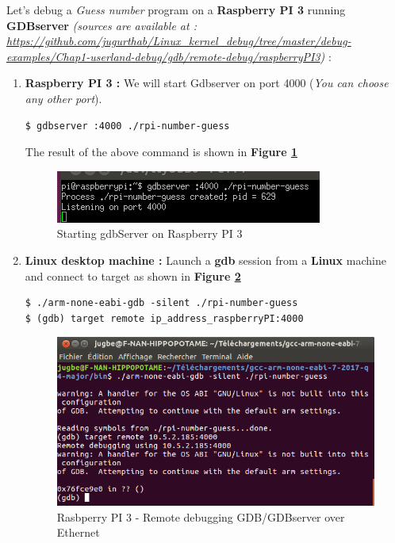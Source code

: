 	


Let's debug a \og \emph{Guess number} \fg program on a \textbf{Raspberry PI 3} running \textbf{GDBserver} \emph{(sources are available at : {\color{blue} \url{https://github.com/jugurthab/Linux_kernel_debug/tree/master/debug-examples/Chap1-userland-debug/gdb/remote-debug/raspberryPI3}})} : 
\begin{enumerate}
	\item \textbf{Raspberry PI 3 : } We will start Gdbserver on port 4000 (\emph{You can choose any other port}).
	\begin{lstlisting}[style=BashInputStyle]
$ gdbserver :4000 ./rpi-number-guess
    \end{lstlisting}

The result of the above command is shown in \textbf{Figure \ref{Starting gdbServer on Raspberry PI 3}}
\begin{figure}[H]
		\centering
        \includegraphics[scale=0.40]{img/solution/starting-ethernet-gdbserver-session-rp3.png}
        \caption{Starting gdbServer on Raspberry PI 3}
        \label{Starting gdbServer on Raspberry PI 3}
    \end{figure}



	\item \textbf{Linux desktop machine :} Launch a \textbf{gdb} session from a \textbf{Linux} machine and connect to target as shown in \textbf{Figure \ref{Rasbperry PI 3 - Remote debugging GDB/GDBserver over Ethernet}}
		\begin{lstlisting}[style=BashInputStyle]
$ ./arm-none-eabi-gdb -silent ./rpi-number-guess
$ (gdb) target remote ip_address_raspberryPI:4000	
    \end{lstlisting}
	
\begin{figure}[H]
		\centering
        \includegraphics[scale=0.33]{img/solution/gdb-server-ethernet.png}
        \caption{Rasbperry PI 3 - Remote debugging GDB/GDBserver over Ethernet}
        \label{Rasbperry PI 3 - Remote debugging GDB/GDBserver over Ethernet}
    \end{figure}	
	

\end{enumerate}
